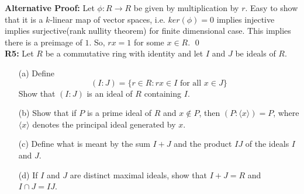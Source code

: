 \textbf{Alternative Proof:} Let $ \phi: R\to R $ be given by multiplication by $ r $. Easy to show that it is a $ k $-linear map of vector spaces, i.e. $ ker(\phi)=0 $ implies injective implies surjective(rank nullity theorem) for finite dimensional case. This implies there is a preimage of $ 1 $. So, $ rx=1 $ for some $ x\in R $.   
\qed\\
\newpage
\textbf{R5:} Let $R$ be a commutative ring with identity and let $I$ and $J$ be ideals of $R$.\\
\begin{itemize}
	\item[(a)] Define
$$
(I: J)=\{r \in R: r x \in I \text { for all } x \in J\}
$$
Show that $(I: J)$ is an ideal of $R$ containing $I$.
	\item[(b)] Show that if $P$ is a prime ideal of $R$ and $x \notin P$, then $(P:\langle x\rangle)=P$, where $\langle x\rangle$ denotes the principal ideal generated by $x$.
	\item[(c)] Define what is meant by the sum $I+J$ and the product $I J$ of the ideals $I$ and $J$.
	\item[(d)] If $I$ and $J$ are distinct maximal ideals, show that $I+J=R$ and $I \cap J=I J$.
\end{itemize}

\soln

